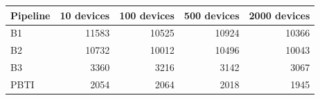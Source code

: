 \begin{tabular}{lrrrr}
\toprule
Pipeline & 10 devices & 100 devices & 500 devices & 2000 devices\\
\midrule
B1 & 11583 & 10525 & 10924 & 10366\\
B2 & 10732 & 10012 & 10496 & 10043\\
B3 & 3360 & 3216 & 3142 & 3067\\
PBTI & 2054 & 2064 & 2018 & 1945\\
\bottomrule
\end{tabular}